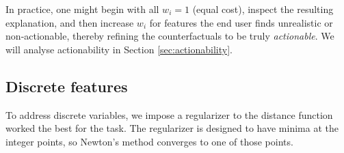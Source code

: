 \documentclass[12pt]{extarticle}
\numberwithin{equation}{section}
\begin{document}
In practice, one might begin with all $w_i = 1$ (equal cost), inspect the resulting explanation, and then increase $w_i$ for features the end user finds unrealistic or non‐actionable, thereby refining the counterfactuals to be truly \emph{actionable}. We will analyse actionability in Section \ref{sec:actionability}.

\subsection{Discrete features}\label{sec:discrete}
To address discrete variables, we impose a regularizer to the distance function worked the best for the task. The regularizer is designed to have minima at the integer points, so Newton's method converges to one of those points.

\end{document}
